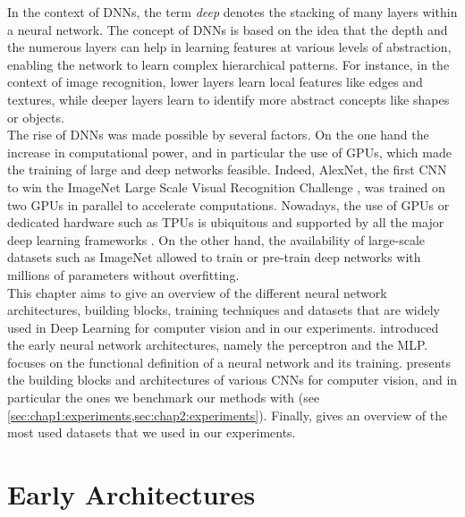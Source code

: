 In the context of \acp{DNN}, the term \emph{deep} denotes the stacking of many
layers within a neural network. The concept of \acp{DNN} is based on the idea
that the depth and the numerous layers can help in learning features at various
levels of abstraction, enabling the network to learn complex hierarchical
patterns. For instance, in the context of image recognition, lower layers learn
local features like edges and textures, while deeper layers learn to identify
more abstract concepts like shapes or objects.\\

The rise of \acp{DNN} was made possible by several factors. On the one hand the
increase in computational power, and in particular the use of \acp{GPU}, which
made the training of large and deep networks feasible. Indeed, AlexNet, the
first \ac{CNN} to win the ImageNet Large Scale Visual Recognition Challenge
\cite{DBLP:conf/nips/KrizhevskySH12}, was trained on two \acp{GPU} in parallel
to accelerate computations. Nowadays, the use of \acp{GPU} or dedicated hardware
such as \acp{TPU} \cite{jouppi2017datacenter} is ubiquitous and supported by all
the major deep learning frameworks
\cite{DBLP:journals/corr/AbadiABBCCCDDDG16,DBLP:conf/nips/PaszkeGMLBCKLGA19}. On
the other hand, the availability of large-scale datasets such as ImageNet
\cite{deng2009imagenet} allowed to train or pre-train deep networks with
millions of parameters without overfitting.\\

This chapter aims to give an overview of the different neural network
architectures, building blocks, training techniques and datasets that are widely
used in Deep Learning for computer vision and in our experiments.
 introduced the early neural network
architectures, namely the perceptron and the \ac{MLP}. 
focuses on the functional definition of a neural network and its training.
 presents the building blocks and architectures of various
\acp{CNN} for computer vision, and in particular the ones we benchmark our
methods with (see \cref{sec:chap1:experiments,sec:chap2:experiments}). Finally,
 gives an overview of the most used datasets that we used
in our experiments.


\section{Early Architectures}\label{sec:dlo:early_architectures}

